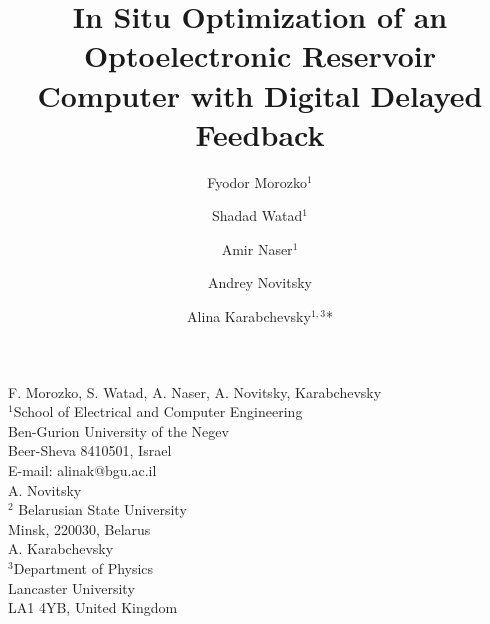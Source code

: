 \documentclass{WileyMSP-template}
\begin{document}


\title{In Situ Optimization of an Optoelectronic Reservoir Computer with Digital Delayed Feedback}

\maketitle


\author{Fyodor Morozko$^1$}
\author{Shadad Watad$^1$}
\author{Amir Naser$^1$}
\author{Andrey Novitsky}
\author{Alina Karabchevsky$^{1,3}$*}


\begin{affiliations}

F. Morozko, S. Watad, A. Naser, A. Novitsky, Karabchevsky\\
$^1$School of Electrical and Computer Engineering\\
Ben-Gurion University of the Negev\\
Beer-Sheva 8410501, Israel\\
E-mail: alinak@bgu.ac.il\\

A. Novitsky\\
$^2$ Belarusian State University\\
Minsk, 220030, Belarus\\


A. Karabchevsky\\
$^3$Department of Physics\\
Lancaster University\\
LA1 4YB, United Kingdom

\end{affiliations}



\\

\end{document}
